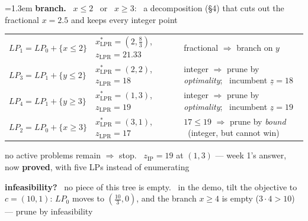 \documentclass[10pt]{article}
\newenvironment{board}{%
  \par\vspace{2pt}
  \begingroup\leftskip=1.3em\relax}{%
  \par\endgroup\vspace{2pt}}
\begin{document}
\begin{board}
\textbf{branch.} \ $x \le 2$ \ or \ $x \ge 3$: \ a decomposition (\S 4) that cuts out the fractional $x = 2.5$ and keeps every integer point
\begin{center}
\begin{tabular}{@{}lll@{}}
 $LP_1 = LP_0 + \{x \le 2\}$ & $x^{*}_{\mathrm{LPR}} = (2, \frac83)$, \ $z_{\mathrm{LPR}} = 21.33$ & fractional $\Rightarrow$ branch on $y$ \\[2pt]
 $LP_3 = LP_1 + \{y \le 2\}$ & $x^{*}_{\mathrm{LPR}} = (2,2)$, \ $z_{\mathrm{LPR}} = 18$ & integer $\Rightarrow$ prune by \emph{optimality}; \ incumbent $\underline{z} = 18$ \\[2pt]
 $LP_4 = LP_1 + \{y \ge 3\}$ & $x^{*}_{\mathrm{LPR}} = (1,3)$, \ $z_{\mathrm{LPR}} = 19$ & integer $\Rightarrow$ prune by \emph{optimality}; \ incumbent $\underline{z} = 19$ \\[2pt]
 $LP_2 = LP_0 + \{x \ge 3\}$ & $x^{*}_{\mathrm{LPR}} = (3,1)$, \ $z_{\mathrm{LPR}} = 17$ & $17 \le 19$ $\Rightarrow$ prune by \emph{bound} \ (integer, but cannot win) \\
\end{tabular}
\end{center}
no active problems remain $\Rightarrow$ stop. \ $z_{\mathrm{IP}} = 19$ at $(1,3)$ --- week 1's answer, now \textbf{proved}, with five LPs instead of enumerating
\vspace{2pt}

\textbf{infeasibility?} \ no piece of this tree is empty. \ in the demo, tilt the objective to $c = (10,1)$: $LP_0$ moves to $(\frac{10}{3}, 0)$,
and the branch $x \ge 4$ is empty ($3 \cdot 4 > 10$) --- prune by infeasibility
\vspace{3pt}


\end{board}
\end{document}
